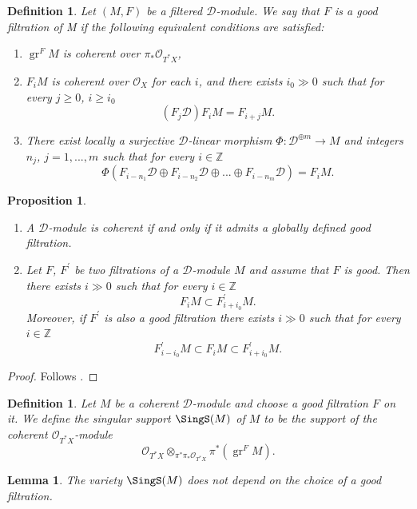 \documentclass[9pt]{amsart}
\newcommand{\bZ}{{\mathbb Z}}
\newcommand{\cD}{{\mathcal D}}
\newcommand{\cO}{{\mathcal O}}
\DeclareMathOperator{\gr}{{gr}}
\newtheorem{pr}[subsubsection]{Proposition}
\newtheorem{lm}[subsubsection]{Lemma}
\newtheorem{df}[subsubsection]{Definition}
\numberwithin{equation}{section}
\begin{document}
	\begin{df}
		Let $(M, F)$ be a filtered $\cD$-module. We say that $F$ is a good
		filtration of M if the following equivalent conditions are satisfied: 
		\begin{enumerate}
			\item $\gr^F M$ is coherent over $\pi_* \cO_{T^*X}$,
			\item $F_iM$ is coherent over $\cO_X$ for each $i$, and there exists $i_0 \gg 0$ such that for every $j \geq 0$, $i \geq i_0$
			$$(F_j\cD) F_iM = F_{i+j}M.$$
			\item There exist locally a surjective $\cD$-linear morphism $\Phi: \cD^{\oplus m} \rightarrow M$ and integers $n_j$, $j=1, ..., m$ such that for every $i \in \bZ$
			$$\Phi(F_{i-n_1}\cD \oplus F_{i-n_2}\cD \oplus ... \oplus F_{i-n_m}\cD) = F_iM.$$
		\end{enumerate}
	\end{df}
	
	\begin{pr}
		\begin{enumerate}
			\item A $\cD$-module is coherent if and only if it admits a globally defined good filtration.
			\item Let $F$, $F^{\prime}$ be two filtrations of a  $\cD$-module $M$ and assume that $F$ is good. Then
			there exists $i \gg 0$  such that for every $i \in \bZ$
			$$F_iM \subset F_{i+i_0}^{\prime}M.$$
			Moreover, if $F^{\prime}$ is also a good filtration there exists $i \gg 0$ such that for every $i \in \bZ$
			$$F_{i-i_0}^{\prime}M \subset F_iM \subset F_{i+i_0}^{\prime}M.$$
		\end{enumerate}
	\end{pr}
	
	\begin{proof}
		Follows \cite[Theorem 2.3]{HTT}.
	\end{proof}
	
	\begin{df}
		Let $M$ be a coherent $\cD$-module and choose a good filtration $F$ on it. We define the singular support $\SingS(M)$ of $M$ to be the support of the coherent $\cO_{T^*X}$-module $$\cO_{T^*X} \otimes_{\pi^* \pi_* \cO_{T^*X}} \pi^*(\gr^F M).$$
	\end{df}
	
	\begin{lm}
		The variety $\SingS(M)$ does not depend on the choice of a good filtration. 
	\end{lm}
	
\end{document}
